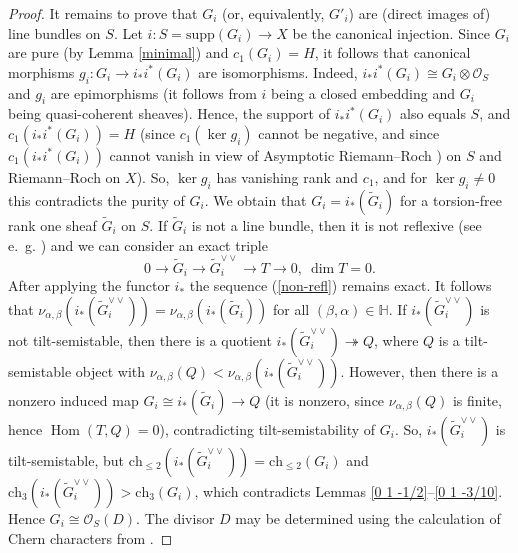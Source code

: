 \documentclass{amsart}
\DeclareMathOperator{\Hom}{Hom}
\begin{document}
\begin{proof}
It remains to prove that $G_i$ (or, equivalently, $G'_i$) are (direct images of) line bundles on $S$. Let $i:S=\mathrm{supp}(G_i)\to X$ be the canonical injection. Since $G_i$ are pure (by Lemma \ref{minimal}) and $c_1(G_i)=H$, it follows that canonical morphisms $g_i:G_i\to i_*i^*(G_i)$ are isomorphisms. Indeed, $i_*i^*(G_i)\cong G_i\otimes\mathcal O_S$ and $g_i$ are epimorphisms (it follows from $i$ being a closed embedding and $G_i$ being quasi-coherent sheaves). Hence, the support of $i_*i^*(G_i)$ also equals $S$, and $c_1(i_*i^*(G_i))=H$ (since $c_1(\ker g_i)$ cannot be negative, and since $c_1(i_*i^*(G_i))$ cannot vanish in view of Asymptotic Riemann--Roch \cite[Theorem 1.1.24]{Laz}) on $S$ and Riemann--Roch on $X$). So, $\ker g_i$  has vanishing rank and $c_1$, and for $\ker g_i\neq 0$ this contradicts the purity of $G_i$. We obtain that $G_i=i_*(\widetilde{G}_i)$ for a torsion-free rank one sheaf $\widetilde{G}_i$ on $S$. If $\widetilde{G}_i$ is not a line bundle, then it is not reflexive (see e.~g. \cite[p.~76]{OSS}) and we can consider an exact triple
\begin{equation}\label{non-refl}0\to\widetilde{G}_i\to\widetilde{G}_i^{\vee\vee}\to T\to 0,\ \dim T=0.\end{equation}
After applying the functor $i_*$ the sequence (\ref{non-refl}) remains exact. It follows that $\nu_{\alpha,\beta}(i_*(\widetilde{G}_i^{\vee\vee}))=\nu_{\alpha,\beta}(i_*(\widetilde{G}_i))$ for all $(\beta,\alpha)\in\mathbb H$. If $i_*(\widetilde{G}_i^{\vee\vee})$ is not tilt-semistable, then there is a quotient $i_*(\widetilde{G}_i^{\vee\vee})\twoheadrightarrow Q$, where $Q$ is a tilt-semistable object with $\nu_{\alpha,\beta}(Q)<\nu_{\alpha,\beta}(i_*(\widetilde{G}_i^{\vee\vee}))$. However, then there is a nonzero induced map $G_i\cong i_*(\widetilde{G}_i)\to Q$ (it is nonzero, since $\nu_{\alpha,\beta}(Q)$ is finite, hence $\Hom(T,Q)=0$), contradicting tilt-semistability of $G_i$. So, $i_*(\widetilde{G}_i^{\vee\vee})$ is tilt-semistable, but $\mathrm{ch}_{\le 2}(i_*(\widetilde{G}_i^{\vee\vee}))=\mathrm{ch}_{\le 2}(G_i)$ and $\mathrm{ch}_3(i_*(\widetilde{G}_i^{\vee\vee}))>\mathrm{ch}_3(G_i)$, which contradicts Lemmas \ref{0 1 -1/2}--\ref{0 1 -3/10}. Hence $G_i\cong\mathcal O_S(D)$. The divisor $D$ may be determined using the calculation of Chern characters from \cite[Proposition 4.4]{Vass}.
\end{proof}
\end{document}
